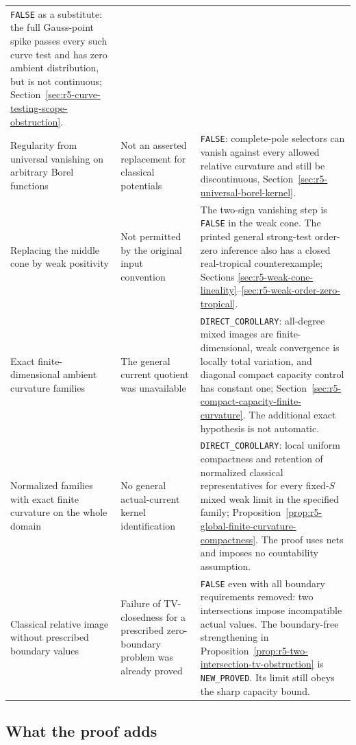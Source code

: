 \documentclass[11pt,a4paper]{article}
\numberwithin{equation}{section}
\theoremstyle{definition}
\theoremstyle{remark}
\begin{document}
\begin{longtable}{@{}p{}p{}p{}@{}}
\texttt{FALSE} as a substitute: the full Gauss-point spike
passes every such curve test and has zero ambient distribution,
but is not continuous; Section~\ref{sec:r5-curve-testing-scope-obstruction}.\\
Regularity from universal vanishing on arbitrary Borel functions &
Not an asserted replacement for classical potentials &
\texttt{FALSE}: complete-pole selectors can vanish against
every allowed relative curvature and still be discontinuous,
Section~\ref{sec:r5-universal-borel-kernel}.\\
Replacing the middle cone by weak positivity &
Not permitted by the original input convention &
The two-sign vanishing step is \texttt{FALSE} in the weak cone.
The printed general strong-test order-zero inference also has
a closed real-tropical counterexample; Sections
\ref{sec:r5-weak-cone-lineality}--\ref{sec:r5-weak-order-zero-tropical}.\\
Exact finite-dimensional ambient curvature families &
The general current quotient was unavailable &
\texttt{DIRECT\_COROLLARY}: all-degree mixed images are
finite-dimensional, weak convergence is locally total variation,
and diagonal compact capacity control has constant one;
Section~\ref{sec:r5-compact-capacity-finite-curvature}.
The additional exact hypothesis is not automatic.\\
Normalized families with exact finite curvature on the whole domain &
No general actual-current kernel identification &
\texttt{DIRECT\_COROLLARY}: local uniform compactness and
retention of normalized classical representatives for every
fixed-$S$ mixed weak limit in the specified family;
Proposition~\ref{prop:r5-global-finite-curvature-compactness}.
The proof uses nets and imposes no countability assumption.\\
Classical relative image without prescribed boundary values &
Failure of TV-closedness for a prescribed zero-boundary
problem was already proved &
\texttt{FALSE} even with all boundary requirements removed:
two intersections impose incompatible actual values.
The boundary-free strengthening in
Proposition~\ref{prop:r5-two-intersection-tv-obstruction} is
\texttt{NEW\_PROVED}. Its limit still obeys the sharp
capacity bound.\\
\bottomrule
\end{longtable}
\endgroup

\subsection{What the proof adds}
\end{document}
